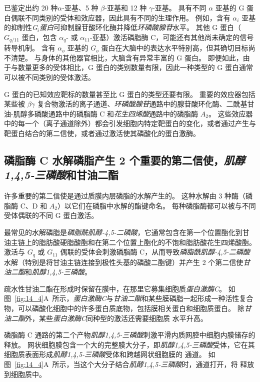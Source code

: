 已鉴定出约 20 种$\alpha$-亚基、5 种 $\beta$-亚基和 12 种 $\gamma$-亚基。
具有不同 $\alpha$ 亚基的 G 蛋白偶联不同类别的受体和效应器，因此具有不同的生理作用。
例如，含有 $\alpha _i$ 亚基的抑制性\textit{G$_i $蛋白}可抑制腺苷酸环化酶并降低\textit{环磷酸腺苷}水平。
其他 G 蛋白（$ G_{q/11} $ 蛋白，包含 $\alpha_q$- 或 $\alpha_{11}$-亚基）激活磷脂酶 C，可能还有其他尚未确定的信号转导机制。
含有 $\alpha_o$ 亚基的 $G_o$ 蛋白在大脑中的表达水平特别高，但其确切目标尚不清楚。
与身体的其他器官相比，大脑含有异常丰富的 G 蛋白。
即便如此，由于与数量更多的受体相比，G 蛋白的类别数量有限，因此一种类型的 G 蛋白通常可以被不同类别的受体激活。


G 蛋白的已知效应靶标的数量甚至比 G 蛋白的类型还要有限。
重要的效应器包括某些被 $\beta \gamma$ 复合物激活的离子通道、\textit{环磷酸腺苷}通路中的腺苷酸环化酶、二酰基甘油-肌醇多磷酸通路中的磷脂酶 C 和\textit{花生四烯酸}通路中的磷脂酶 $A_2$。
这些效应器中的每一个（离子通道除外）都会引发细胞内特定靶蛋白的变化，或者通过产生与靶蛋白结合的第二信使，或者通过激活使其磷酸化的蛋白激酶。



\subsection{磷脂酶 C 水解磷脂产生 2 个重要的第二信使，\textit{肌醇1,4,5-三磷酸}和甘油二酯}

许多重要的第二信使是通过质膜内层磷脂的水解产生的。 
这种水解由 3 种酶（磷脂酶 C、D 和 $A_2$）以它们在磷脂中水解的酯键命名。
每种磷脂酶都可以被与不同受体偶联的不同 G 蛋白激活。


最常见的水解磷脂是\textit{磷脂酰肌醇-4,5-二磷酸}，它通常包含在第一个位置酯化到甘油主链上的脂肪酸硬脂酸酯和在第二个位置上酯化的不饱和脂肪酸花生四烯酸酯。
激活与 $ G_q $ 或 $ G_{11} $ 偶联的受体会刺激磷脂酶 C，从而导致\textit{磷脂酰肌醇-4,5-二磷酸}水解（特别是将甘油主链连接到极性头基的磷酸二酯键）并产生 2 个第二信使\textit{甘油二酯}和\textit{肌醇1,4,5-三磷酸}。


疏水性甘油二酯在形成时保留在膜中，在那里它募集细胞质\textit{蛋白激酶C}。
如图~\ref{fig:14_4}A~所示，\textit{蛋白激酶C}与\textit{甘油二酯}和某些膜磷脂一起形成一种活性复合物，可以磷酸化细胞中的许多蛋白质底物，包括膜相关蛋白和细胞质蛋白。
除\textit{甘油二酯}外，某些\textit{蛋白激酶C}同种型的激活还需要细胞质  水平升高。


磷脂酶 C 通路的第二个产物\textit{肌醇1,4,5-三磷酸}刺激平滑内质网腔中细胞内膜储存的  释放。
网状细胞膜包含一个大的完整膜大分子，即\textit{肌醇1,4,5-三磷酸}受体，它在其细胞质表面形成\textit{肌醇1,4,5-三磷酸}受体和跨越网状细胞膜的  通道。
如图~\ref{fig:14_4}A~所示，当这个大分子结合\textit{肌醇1,4,5-三磷酸}时，通道打开，将  释放到细胞质中。


